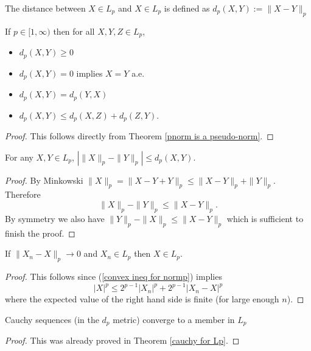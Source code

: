 \begin{definition}[{\bf distances in $L_p$}]
The distance between $X\in L_p$ and $X\in L_p$ is defined as $d_p(X, Y):= \|X-Y\|_p$
\end{definition}

\begin{theorem}
If $p\in [1,\infty)$ then for all $X, Y, Z \in L_p$,
\begin{itemize}
\item $d_p(X,Y) \geq 0$
\item $d_p(X,Y)= 0$ implies $X = Y$ a.e.
\item $d_p(X,Y)= d_p(Y,X)$
\item $d_p(X,Y)\leq d_p(X,Z) + d_p(Z,Y)$.
\end{itemize}
\end{theorem}
\begin{proof}
This follows directly from Theorem \ref{pnorm is a pseudo-norm}.
\end{proof}


\begin{theorem}
\label{Continuity of Lp}
For any $X,Y\in L_p$,
$|\|X\|_p - \|Y\|_p|\leq d_p(X,Y)$.
\end{theorem}
\begin{proof}
By Minkowski $\|X \|_p= \|X -Y +Y\|_p\leq \|X -Y\|_p +\|Y\|_p$. Therefore
\[\|X \|_p -  \|Y\|_p\leq  \|X -Y\|_p. \]
By symmetry we also have $\|Y \|_p -  \|X\|_p\leq  \|X -Y\|_p$
which is sufficient to finish the proof.
\end{proof}



\begin{theorem}[{\bf $L_p$ is closed}]
\label{Lp is closed}
If $\|X_n - X\|_p\rightarrow 0$ and $X_n \in L_p$ then $X\in L_p$.
\end{theorem}
\begin{proof} 
This follows since (\ref{convex ineq for normp}) implies
\[ |X|^p \leq 2^{p-1}|X_n|^p +  2^{p-1}|X_n-X|^p  \]
where the expected value of the right hand side is finite (for large enough $n$).
\end{proof}



\begin{theorem}[{\bf $L_p$ is complete}]
Cauchy sequences (in the $d_p$ metric) converge to a member in $L_p$
\end{theorem}
\begin{proof} This was already proved in Theorem \ref{cauchy for Lp}.
\end{proof}


